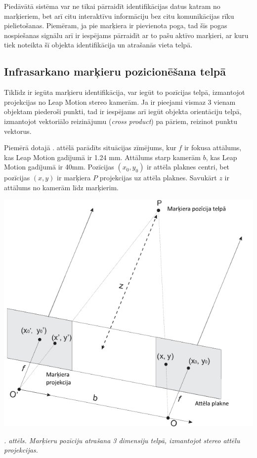 \documentclass[12pt, a4paper, oneside, openright]{article}
\renewcommand{\thecimages}{\arabic{cimages}}
\begin{document}
\par
Piedāvātā sistēma var ne tikai pārraidīt identifikācijas datus katram no marķieriem, bet
arī citu interaktīvu informāciju bez citu komunikācijas rīku pielietošanas.
Piemēram, ja pie marķiera ir pievienota poga, tad šīs pogas nospiešanas signālu arī ir
iespējams pārraidīt ar to pašu aktīvo marķieri, ar kuru tiek noteikta šī objekta
identifikācija un atrašanās vieta telpā.

\newpage
\subsection{Infrasarkano marķieru pozicionēšana telpā}\label{section_stereo}

\par
Tiklīdz ir iegūta marķieru identifikācija, var iegūt to pozīcijas telpā, izmantojot projekcijas no 
Leap Motion stereo kamerām. Ja ir pieejami vismaz 3 vienam objektam piederoši punkti, tad ir iespējams
arī iegūt objekta orientāciju telpā, izmantojot vektoriālo reizinājumu (\textit{cross product}) pa pāriem,
reizinot punktu vektorus.

\par 
Piemērā dotajā . attēlā parādīts situācijas zīmējums, kur
$f$ ir fokusa attālums, kas Leap Motion gadījumā ir 1.24 mm. Attālums starp kamerām $b$, kas Leap Motion gadījumā ir 40mm.
Pozīcijas $(x_0, y_0)$ ir attēla plaknes centri, bet pozīcijas $(x,y)$ ir marķiera $P$ projekcijas uz attēla plaknes.
Savukārt $z$ ir attālums no kamerām līdz marķierim. 

\label{cimages:stereo_1.png}
\vspace{10pt}
\begin{samepage}
\begin{center}
\includegraphics[width=0.8\columnwidth]{images/stereo_1.png}
\begin{center}
\footnotesize{
\textit{\thecimages. attēls. Marķieru pozīciju atrašana 3 dimensiju telpā, izmantojot stereo attēlu projekcijas.}}
\end{center}
\end{center}
\end{samepage}
\end{document}
